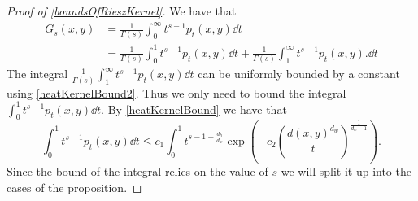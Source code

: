 \begin{proof}[Proof of \cref{boundsOfRieszKernel}]
	We have that
	\begin{align}
		G_s(x,y) &= \frac{1}{\Gamma(s)}\int_{0}^{\infty} t^{s-1}p_t(x,y) \dd t \\
		&=\frac{1}{\Gamma(s)}\int_{0}^{1} t^{s-1}p_t(x,y) \dd t + \frac{1}{\Gamma(s)}\int_{1}^{\infty} t^{s-1}p_t(x,y). \dd t 
	\end{align}
	The integral $\frac{1}{\Gamma(s)}\int_{1}^{\infty} t^{s-1}p_t(x,y) \dd t$ can be uniformly bounded by a constant using \cref{heatKernelBound2}. Thus we only need to bound the integral $\int_{0}^{1} t^{s-1}p_t(x,y) \dd t$. By \eqref{heatKernelBound} we have that
	\begin{equation}
		\int_{0}^{1} t^{s-1}p_t(x,y) \dd t \leq c_1 \int_{0}^{1} t^{s-1-\frac{d_h}{d_w}} \exp\left(-c_2 \left(\frac{d(x,y)^{d_w}}{t}\right)^{\frac{1}{d_w -1}}\right).
	\end{equation}
	Since the bound of the integral relies on the value of $s$ we will split it up into the cases of the proposition.
	

\end{proof}
